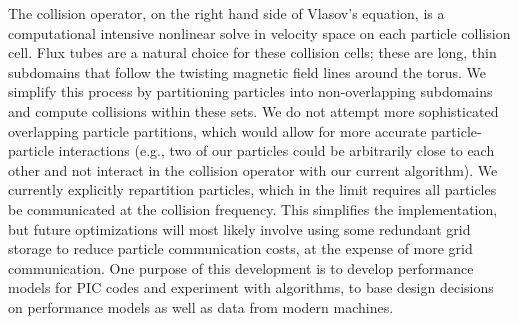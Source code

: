 \documentclass[review]{siamart}
\begin{document}
The collision operator, on the right hand side of Vlasov's equation, is a computational intensive nonlinear solve in velocity space on each particle collision cell.
Flux tubes are a natural choice for these collision cells; these are long, thin subdomains that follow the twisting magnetic field lines around the torus.
We simplify this process by partitioning particles into non-overlapping subdomains and compute collisions within these sets.
We do not attempt more sophisticated overlapping particle partitions, which would allow for more accurate particle-particle interactions (e.g., two of our particles could be arbitrarily close to each other and not interact in the collision operator with our current algorithm).
We currently explicitly repartition particles, which in the limit requires all particles be communicated at the collision frequency.
This simplifies the implementation, but future optimizations will most likely involve using some redundant grid storage to reduce particle communication costs, at the expense of more grid communication.
One purpose of this development is to develop performance models for PIC codes and experiment with algorithms, to base design decisions on performance models as well as data from modern machines.
\end{document}
